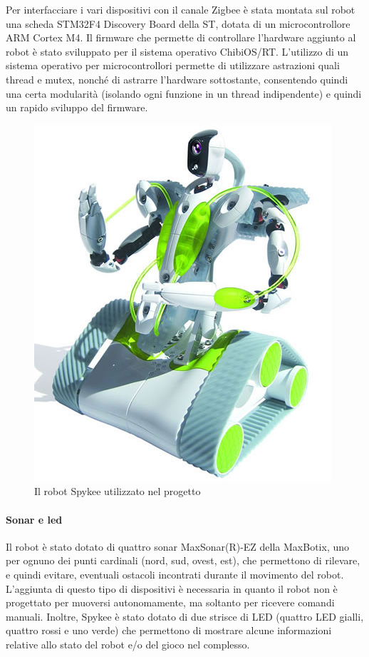 Per interfacciare i vari dispositivi con il canale Zigbee è stata montata sul robot una scheda STM32F4 Discovery Board della ST, dotata di un microcontrollore ARM Cortex M4. Il firmware che permette di controllare l'hardware aggiunto al robot è stato sviluppato per il sistema operativo ChibiOS/RT\cite{chibios}.
L'utilizzo di un sistema operativo per microcontrollori permette di utilizzare astrazioni quali thread e mutex, nonché di astrarre l'hardware sottostante, consentendo quindi una certa modularità (isolando ogni funzione in un thread indipendente) e quindi un rapido sviluppo del firmware.

\begin{figure}[h]
\centering
\includegraphics[scale=0.4]{images/spykee}
\caption{Il robot Spykee utilizzato nel progetto}
\end{figure}

\paragraph{Sonar e led} Il robot è stato dotato di quattro sonar MaxSonar(R)-EZ della MaxBotix, uno per ognuno dei punti cardinali (nord, sud, ovest, est), che permettono di rilevare, e quindi evitare, eventuali ostacoli incontrati durante il movimento del robot. L'aggiunta di questo tipo di dispositivi è necessaria in quanto il robot non è progettato per muoversi autonomamente, ma soltanto per ricevere comandi manuali. Inoltre, Spykee è stato dotato di due strisce di LED (quattro LED gialli, quattro rossi e uno verde) che permettono di mostrare alcune informazioni relative allo stato del robot e/o del gioco nel complesso.

